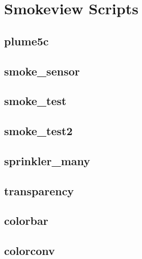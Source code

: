 \documentclass[11pt,twoside]{book}
\begin{document}
\chapter{Smokeview Scripts}
\label{smvscripts}

\section{plume5c}
\label{SSFplume5c}

\section{smoke\_sensor}
\label{SSFsmokesensor}

\section{smoke\_test}
\label{SSFsmoketest}

\section{smoke\_test2}
\label{SSFsmoketest2}

\section{sprinkler\_many}
\label{SSFspinklermany}

\section{transparency}
\label{SSFtransparency}

\section{colorbar}
\label{SSFcolorbar}

\section{colorconv}
\label{SSFcolorconv}
\end{document}
